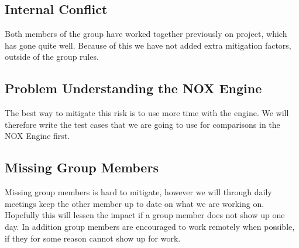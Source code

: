 \subsection*{Internal Conflict}
Both members of the group have worked together previously on project,
which has gone quite well. 
Because of this we have not added extra mitigation factors, 
outside of the group rules.

\subsection*{Problem Understanding the NOX Engine}
The best way to mitigate this risk is to use more time with the engine.
We will therefore write the test cases that we are
going to use for comparisons in the NOX Engine first.


\subsection*{Missing Group Members}
Missing group members is hard to mitigate, however 
we will through daily meetings keep the other member
up to date on what we are working on. 
Hopefully this will lessen the impact if a group member
does not show up one day.
In addition group members are encouraged to work remotely when possible,
if they for some reason cannot show up for work.